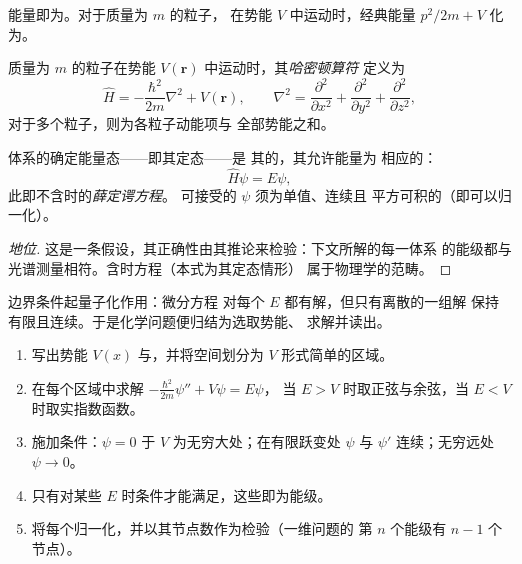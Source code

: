 能量即为。对于质量为 $m$ 的粒子，
在势能 $V$ 中运动时，经典能量 $p^2/2m + V$ 化为。

\begin{definition}[哈密顿算符]\label{def:b3:quantum-model-systems:schrodinger}
质量为 $m$ 的粒子在势能 $V(\mathbf r)$ 中运动时，其\emph{哈密顿算符}
定义为
\[
\hat H = -\frac{\hbar^2}{2m}\nabla^2 + V(\mathbf r), \qquad \nabla^2 =
\frac{\partial^2}{\partial x^2} + \frac{\partial^2}{\partial y^2} +
\frac{\partial^2}{\partial z^2},
\]
对于多个粒子，则为各粒子动能项与
全部势能之和。
\end{definition}

\begin{theorem}[薛定谔方程]\label{thm:b3:quantum-model-systems:schrodinger}
体系的确定能量态——即其定态——是
其的，其允许能量为
相应的：
\[
\hat H\psi = E\psi,
\]
此即不含时的\emph{薛定谔方程}。
可接受的 $\psi$ 须为单值、连续且
平方可积的（即可以归一化）。
\end{theorem}
\begin{proof}[地位]
这是一条假设，其正确性由其推论来检验：下文所解的每一体系
的能级都与光谱测量相符。含时方程（本式为其定态情形）
属于物理学的范畴。
\end{proof}

边界条件起量子化作用：微分方程
对每个 $E$ 都有解，但只有离散的一组解
保持有限且连续。于是化学问题便归结为选取势能、
求解并读出。

\begin{method}[一维模型的求解]\label{met:b3:quantum-model-systems:one-dimensional}
\begin{enumerate}
  \item 写出势能 $V(x)$ 与，并将空间划分为
        $V$ 形式简单的区域。
  \item 在每个区域中求解 $-\frac{\hbar^2}{2m}\psi'' + V\psi = E\psi$，
        当 $E > V$ 时取正弦与余弦，当 $E < V$ 时取实指数函数。
  \item 施加条件：$\psi = 0$ 于 $V$ 为无穷大处；在有限跃变处
        $\psi$ 与 $\psi'$ 连续；无穷远处 $\psi \to 0$。
  \item 只有对某些 $E$ 时条件才能满足，这些即为能级。
  \item 将每个归一化，并以其节点数作为检验（一维问题的
        第 $n$ 个能级有 $n - 1$ 个节点）。
\end{enumerate}
\end{method}


